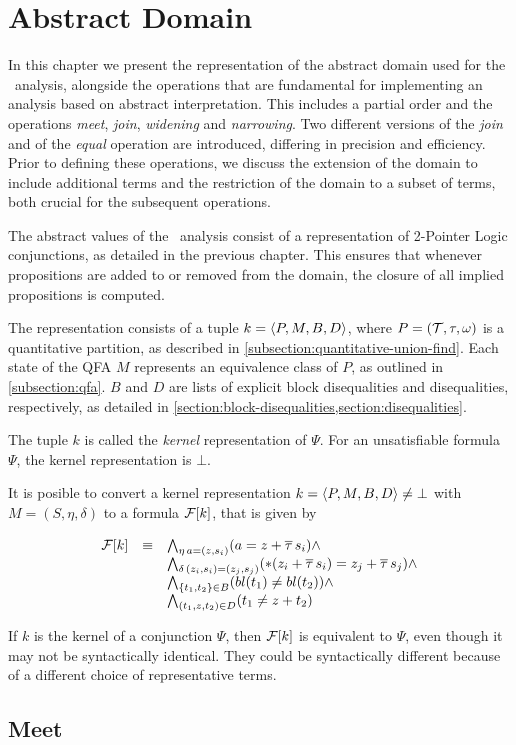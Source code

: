 \chapter{Abstract Domain}

In this chapter we present the representation of the abstract domain used for the \cpo\ analysis, alongside the operations that are fundamental for implementing an analysis based on abstract interpretation.
This includes a partial order and the operations \emph{meet}, \emph{join}, \emph{widening} and \emph{narrowing}.
Two different versions of the \emph{join} and of the \emph{equal} operation are introduced,
differing in precision and efficiency.
Prior to defining these operations, we discuss the extension of the domain to include additional terms and the restriction of the domain to a subset of terms,
both crucial for the subsequent operations.

The abstract values of the \cpo\ analysis consist of a representation
of 2-Pointer Logic conjunctions, as detailed in the previous chapter.
This ensures that whenever propositions are added to or removed from the domain,
the closure of all implied propositions is computed.

The representation consists of a tuple $k = \langle P,M,B,D\rangle$,
where $P = (\mathcal{T}, \tau, \omega)$ is a quantitative partition, as described in \cref{subsection:quantitative-union-find}.
Each state of the QFA $M$ represents an equivalence class of $P$, as outlined in \cref{subsection:qfa}.
$B$ and $D$ are lists of explicit block disequalities and disequalities, respectively, as detailed in \cref{section:block-disequalities,section:disequalities}.

The tuple $k$ is called the \emph{kernel} representation of $\Psi$.
For an unsatisfiable formula $\Psi$, the kernel representation is $\bot$.

It is posible to convert a kernel representation $k = \langle P,M,B,D\rangle \neq \bot$ with $M = (S, \eta, \delta)$ to a formula $\mathcal{F}[k]$, that is given by

\[
\begin{array}{lll}
    \mathcal{F}[k] & \equiv & \bigwedge_{\eta\,a=(z,s_i)} (a = z + \overline{\tau}\,s_i) \land \\
    & & \bigwedge_{\delta\,(z_i,s_i)=(z_j,s_j)} (*(z_i + \overline{\tau}\,s_i) = z_j + \overline{\tau}\,s_j) \land \\
    & & \bigwedge_{\{t_1, t_2\} \in B} (bl(t_1) \neq bl(t_2)) \land \\
    & & \bigwedge_{(t_1, z, t_2) \in D} (t_1 \neq z + t_2)
\end{array}
\]

If $k$ is the kernel of a conjunction $\Psi$, then $\mathcal{F}[k]$ is equivalent to $\Psi$,
even though it may not be syntactically identical.
They could be syntactically different because of a different choice of representative terms.





\section{Meet}





